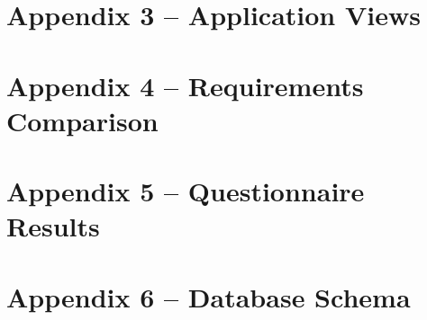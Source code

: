 \documentclass[12pt, a4paper]{report}
\begin{document}
\clearpage
{}
{}
\chapter*{Appendix 3 – Application Views}\label{chapter:appendix-application-views}


\clearpage
{}
{}
\chapter*{Appendix 4 – Requirements Comparison}


\clearpage
{}
{}
\chapter*{Appendix 5 – Questionnaire Results}


\clearpage
{}
{}
\chapter*{Appendix 6 – Database Schema}


\clearpage
{}

\end{document}
